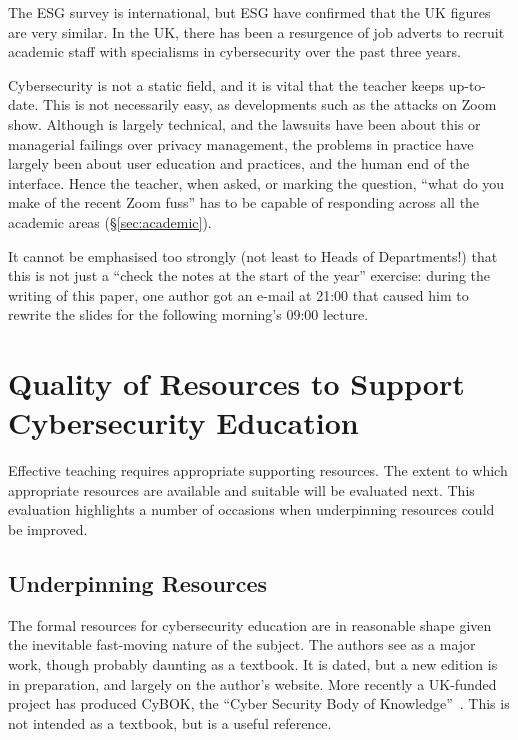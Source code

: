\documentclass[conference]{IEEEtran}
\begin{document}
The ESG survey is international, but ESG have confirmed that the UK figures are very similar. In the UK, there has been a resurgence of job adverts to recruit academic staff with specialisms in cybersecurity over the past three years.

Cybersecurity is not a static field, and it is vital that the teacher keeps up-to-date. This is not necessarily easy, as developments such as the attacks on Zoom \cite[etc.]{MarczakScottRailton2020a} show. Although \cite{MarczakScottRailton2020a} is largely technical, and the lawsuits \cite[etc.]{Dame2020b} have been about this or managerial failings over privacy management, the problems in practice \cite{Abrams2020a,Culafi2020e} have largely been about user education and practices, and the human end of the interface. Hence the teacher, when asked, or marking the question, ``what do you make of the recent Zoom fuss'' has to be capable of responding across all the academic areas (\S\ref{sec:academic}). 

It cannot be emphasised too strongly (not least to Heads of
Departments!) that this is not just a ``check the notes at the start of the year'' exercise: during the writing of this paper, one author %
got an e-mail at 21:00 that caused him to rewrite the slides for the following morning's 09:00 lecture.


\section{Quality of Resources to Support Cybersecurity Education}
Effective teaching requires appropriate supporting resources. The extent to which appropriate resources are available and suitable will be evaluated next. This evaluation highlights a number of occasions when underpinning resources could be improved. 
\subsection{Underpinning Resources}
The formal resources for cybersecurity education are in reasonable
shape given the inevitable fast-moving nature of the subject. The
authors see \cite{Anderson2008} as a major work, though probably
daunting as a textbook. It is dated, but a new edition is in
preparation, and largely on the author's website. More recently a
UK-funded project has produced CyBOK, the ``Cyber Security Body of
Knowledge''~\cite{cybok:2019}. This is not intended as a textbook, but
is a useful reference.
\end{document}
